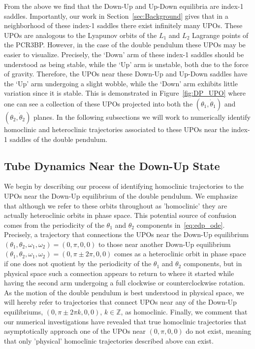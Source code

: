 \documentclass[11pt]{article}
\numberwithin{equation}{section}
\theoremstyle{plain}
\begin{document}
From the above we find that the Down-Up and Up-Down equilibria are index-1 saddles. Importantly, our work in Section~\ref{sec:Background} gives that in a neighborhood of these index-1 saddles there exist infinitely many UPOs. These UPOs are analogous to the Lyapunov orbits of the $L_1$ and $L_2$ Lagrange points of the PCR3BP. However, in the case of the double pendulum these UPOs may be easier to visualize. Precisely, the `Down' arm of these index-1 saddles should be understood as being stable, while the `Up' arm is unstable, both due to the force of gravity. Therefore, the UPOs near these Down-Up and Up-Down saddles have the `Up' arm undergoing a slight wobble, while the `Down' arm exhibits little variation since it is stable. This is demonstrated in Figure~\ref{fig:DP_UPO} where one can see a collection of these UPOs projected into both the $(\theta_1,\dot\theta_1)$ and $(\theta_2,\dot\theta_2)$ planes. In the following subsections we will work to numerically identify homoclinic and heteroclinic trajectories associated to these UPOs near the index-1 saddles of the double pendulum. 




\subsection{Tube Dynamics Near the Down-Up State}\label{sec:L1Hom}

We begin by describing our process of identifying homoclinic trajectories to the UPOs near the Down-Up equilibrium of the double pendulum. We emphasize that although we refer to these orbits throughout as 'homoclinic' they are actually heteroclinic orbits in phase space. This potential source of confusion comes from the periodicity of the $\theta_1$ and $\theta_2$ components in~\eqref{eq:edp_ode}. Precisely, a trajectory that connections the UPOs near the Down-Up equilibrium $(\theta_1,\theta_2,\omega_1,\omega_2) = (0,\pi,0,0)$ to those near another Down-Up equilibrium $(\theta_1,\theta_2,\omega_1,\omega_2) = (0,\pi\pm 2\pi,0,0)$ comes as a heteroclinic orbit in phase space if one does not quotient by the periodicity of the $\theta_1$ and $\theta_2$ components, but in physical space such a connection appears to return to where it started while having the second arm undergoing a full clockwise or counterclockwise rotation. As the motion of the double pendulum is best understood in physical space, we will hereby refer to trajectories that connect UPOs near any of the Down-Up equilibriums, $(0,\pi \pm 2\pi k,0,0)$, $k \in \mathbb{Z}$, as homoclinic. Finally, we comment that our numerical investigations have revealed that true homoclinic trajectories that asymptotically approach one of the UPOs near $(0,\pi,0,0)$ do not exist, meaning that only 'physical' homoclinic trajectories described above can exist.
\end{document}
